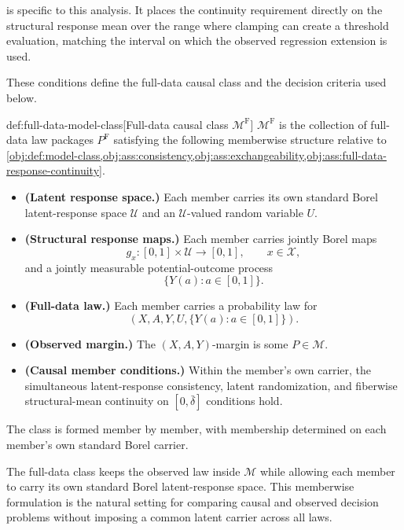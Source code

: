  is specific to this analysis. It places the continuity requirement directly on the structural response mean over the range where clamping can create a threshold evaluation, matching the interval on which the observed regression extension is used.

These conditions define the full-data causal class and the decision criteria used below.

\begin{definitionv}{def:full-data-model-class}[Full-data causal class \(\mathcal M^{\mathrm F}\)]
\(\mathcal M^{\mathrm F}\) is the collection of full-data law packages \(P^{\mathrm F}\) satisfying the following memberwise structure relative to \cref{obj:def:model-class,obj:ass:consistency,obj:ass:exchangeability,obj:ass:full-data-response-continuity}.
\begin{itemize}
\item \textbf{(Latent response space.)} Each member carries its own standard Borel latent-response space \(\mathcal U\) and an \(\mathcal U\)-valued random variable \(U\).
\item \textbf{(Structural response maps.)} Each member carries jointly Borel maps
\[
g_x:[0,1]\times\mathcal U\to[0,1],
\qquad x\in\mathcal X,
\]
and a jointly measurable potential-outcome process
\[
\{Y(a):a\in[0,1]\}.
\]
\item \textbf{(Full-data law.)} Each member carries a probability law for
\[
(X,A,Y,U,\{Y(a):a\in[0,1]\}).
\]
\item \textbf{(Observed margin.)} The \((X,A,Y)\)-margin is some \(P\in\mathcal M\).
\item \textbf{(Causal member conditions.)} Within the member's own carrier, the simultaneous latent-response consistency, latent randomization, and fiberwise structural-mean continuity on \([0,\bar\delta]\) conditions hold.
\end{itemize}
The class is formed member by member, with membership determined on each member's own standard Borel carrier.
\end{definitionv}

The full-data class  keeps the observed law inside \(\mathcal M\) while allowing each member to carry its own standard Borel latent-response space. This memberwise formulation is the natural setting for comparing causal and observed decision problems without imposing a common latent carrier across all laws.

